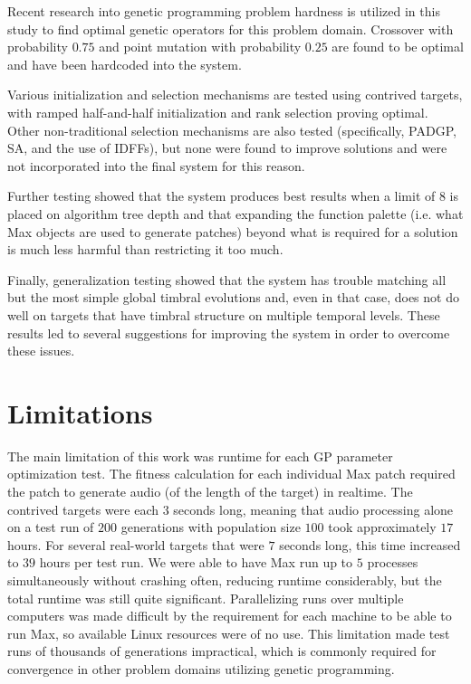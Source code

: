 \documentclass[12pt]{report} 	%
\numberwithin{figure}{chapter}
\numberwithin{table}{chapter}
\numberwithin{equation}{chapter}
\begin{document}
\begin{flushleft}
Recent research into genetic programming problem hardness is utilized in this study to find optimal genetic operators for this problem domain. Crossover with probability $0.75$ and point mutation with probability $0.25$ are found to be optimal and have been hardcoded into the system.

Various initialization and selection mechanisms are tested using contrived targets, with ramped half-and-half initialization and rank selection proving optimal. Other non-traditional selection mechanisms are also tested (specifically, PADGP, SA, and the use of IDFFs), but none were found to improve solutions and were not incorporated into the final system for this reason.

Further testing showed that the system produces best results when a limit of $8$ is placed on algorithm tree depth and that expanding the function palette (i.e. what Max objects are used to generate patches) beyond what is required for a solution is much less harmful than restricting it too much.

Finally, generalization testing showed that the system has trouble matching all but the most simple global timbral evolutions and, even in that case, does not do well on targets that have timbral structure on multiple temporal levels. These results led to several suggestions for improving the system in order to overcome these issues.

\section{Limitations}
The main limitation of this work was runtime for each GP parameter optimization test. The fitness calculation for each individual Max patch required the patch to generate audio (of the length of the target) in realtime. The contrived targets were each $3$ seconds long, meaning that audio processing alone on a test run of $200$ generations with population size $100$ took approximately $17$ hours. For several real-world targets that were $7$ seconds long, this time increased to $39$ hours per test run. We were able to have Max run up to $5$ processes simultaneously without crashing often, reducing runtime considerably, but the total runtime was still quite significant. Parallelizing runs over multiple computers was made difficult by the requirement for each machine to be able to run Max, so available Linux resources were of no use. This limitation made test runs of thousands of generations impractical, which is commonly required for convergence in other problem domains utilizing genetic programming.


\end{flushleft}
\end{document}
